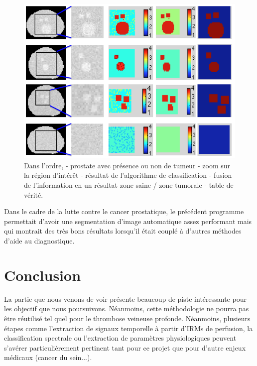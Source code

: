 \begin{figure}[H]
\centering
    \includegraphics[scale=0.5,angle=0]{Images/ResultatAlgo.png}
    \caption{Dans l'ordre, - prostate avec présence ou non de tumeur - zoom sur la région d'intérêt - résultat de l'algorithme de classification - fusion de l'information en un résultat zone saine / zone tumorale - table de vérité.}
    \label{fig:ResultatAlgo}
\end{figure}

Dans le cadre de la lutte contre le cancer prostatique, le précédent programme permettait d'avoir une segmentation d'image automatique assez performant mais qui montrait des très bons résultats lorsqu'il était couplé à d'autres méthodes  d'aide au diagnostique.

\chapter*{Conclusion}

La partie que nous venons de voir présente beaucoup de piste intéressante pour les objectif que nous poursuivons. Néanmoins, cette méthodologie ne pourra pas être réutilisé tel quel pour le thrombose veineuse profonde. Néanmoins, plusieurs étapes comme l'extraction de signaux temporelle à partir d'IRMs de perfusion, la classification spectrale ou l'extraction de paramètres physiologiques peuvent s'avérer particulièrement pertinent tant pour ce projet que pour d'autre enjeux médicaux (cancer du sein...).



